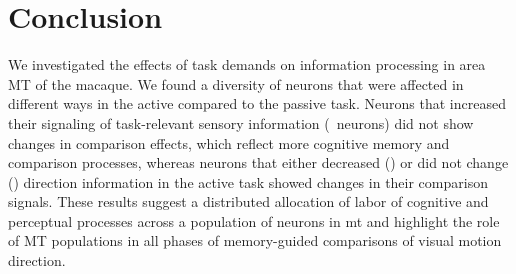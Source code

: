 \section{Conclusion}
We investigated the effects of task demands on information processing in area MT of the macaque. We found a diversity of neurons that were affected in different ways in the active compared to the passive task. 
Neurons that increased their signaling of task-relevant sensory information (\enhanced\ neurons) did not show changes in comparison effects, which reflect more cognitive memory and comparison processes, whereas neurons that either decreased (\suppressed) or did not change (\consistent) direction information in the active task showed changes in their comparison signals.
These results suggest a distributed allocation of labor of cognitive and perceptual processes across a population of neurons in \gls{mt} and highlight the role of MT populations in all phases of memory-guided comparisons of visual motion direction.\label{rev:het4}


